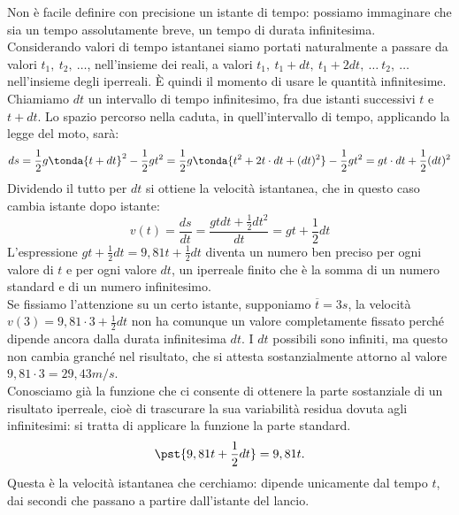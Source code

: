 Non è facile definire con precisione un istante di tempo: possiamo 
immaginare che sia un tempo assolutamente breve, un tempo di durata 
infinitesima.\\ 
Considerando valori di tempo istantanei siamo portati naturalmente a 
passare da valori \(t_1, \ t_2, \ \dots\), nell'insieme dei reali, a valori 
\(t_1, \ t_1+dt, \ t_1+2dt,\ \dots\ t_2, \ \dots\) nell'insieme degli
iperreali. 
È quindi il momento di usare le quantità infinitesime.\\ 
Chiamiamo \(dt\) 
un intervallo di tempo infinitesimo, fra due istanti successivi \(t\) e 
\(t+dt\). 
Lo spazio percorso nella caduta, in quell'intervallo di tempo, 
applicando la legge del moto, sarà: 
\[ds=\frac{1}{2}g\tonda{t+dt}^2-\frac{1}{2}gt^2= 
\frac{1}{2}g\tonda{t^2+2t\cdot 
dt+(dt)^2}-\frac{1}{2}gt^2= gt\cdot dt+\frac{1}{2}(dt)^2\] 
Dividendo il tutto per \(dt\) si ottiene la velocità istantanea, 
che in questo caso cambia istante dopo istante: 
\[v(t)=\frac{ds}{dt}=\frac{gtdt+\frac{1}{2}dt^2}{dt}=gt+\frac{1}{2}dt\] 
L'espressione \(gt+\frac{1}{2}dt=9,81t+\frac{1}{2}dt\) diventa un numero 
ben preciso per ogni valore di \(t\) e per ogni valore \(dt\), un iperreale
finito che è la somma di un numero standard e di un numero infinitesimo.\\ 
Se fissiamo l'attenzione su un certo istante, supponiamo 
\(\overline{t}= 3s\), la velocità \(v(3)=9,81\cdot 3+\frac{1}{2}dt\) 
non ha comunque un valore completamente fissato 
perché dipende ancora dalla durata infinitesima \(dt\). 
I \(dt\) possibili sono infiniti, ma questo non cambia granché nel 
risultato, che si attesta sostanzialmente attorno al valore 
\(9,81\cdot 3=29,43m/s\).\\
Conosciamo già la funzione che ci consente di ottenere la parte sostanziale 
di un risultato iperreale, cioè di trascurare la sua variabilità 
residua dovuta agli infinitesimi: si tratta di applicare la funzione  
la parte standard.
\[ \pst{9,81t+\frac{1}{2}dt}=9,81t.\] 
Questa è la velocità istantanea che cerchiamo: dipende unicamente dal tempo 
\(t\), dai secondi che passano a partire dall'istante del lancio.

